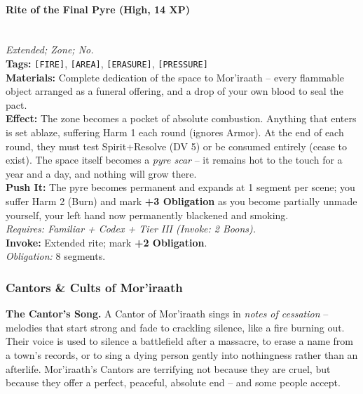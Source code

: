 \paragraph{Rite of the Final Pyre (High, 14 XP)} \hfill \\
\emph{Extended; Zone; No.} \\
\textbf{Tags:} \texttt{[FIRE]}, \texttt{[AREA]}, \texttt{[ERASURE]}, \texttt{[PRESSURE]} \\
\textbf{Materials:} Complete dedication of the space to Mor'iraath – every flammable object arranged as a funeral offering, and a drop of your own blood to seal the pact. \\
\textbf{Effect:} The zone becomes a pocket of absolute combustion. Anything that enters is set ablaze, suffering Harm 1 each round (ignores Armor). At the end of each round, they must test Spirit+Resolve (DV 5) or be consumed entirely (cease to exist). The space itself becomes a \textit{pyre scar} – it remains hot to the touch for a year and a day, and nothing will grow there. \\
\textbf{Push It:} The pyre becomes permanent and expands at 1 segment per scene; you suffer Harm 2 (Burn) and mark \textbf{+3 Obligation} as you become partially unmade yourself, your left hand now permanently blackened and smoking. \\
\emph{Requires: Familiar + Codex + Tier III (\textit{Invoke:} 2 Boons).} \\
\textbf{Invoke:} Extended rite; mark \textbf{+2 Obligation}. \\
\emph{Obligation:} 8 segments.

\subsubsection*{Cantors \& Cults of Mor'iraath}

\textbf{The Cantor’s Song.} A Cantor of Mor'iraath sings in \textit{notes of cessation} – melodies that start strong and fade to crackling silence, like a fire burning out. Their voice is used to silence a battlefield after a massacre, to erase a name from a town’s records, or to sing a dying person gently into nothingness rather than an afterlife. Mor'iraath’s Cantors are terrifying not because they are cruel, but because they offer a perfect, peaceful, absolute end – and some people accept.

